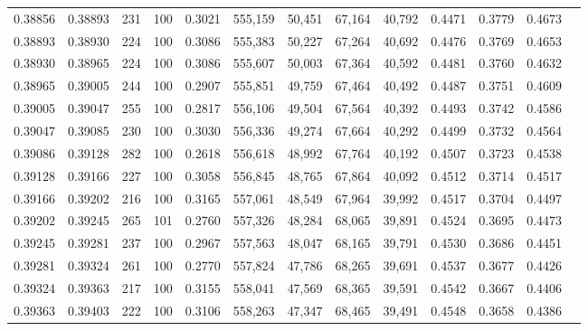 \begin{tabular}{rrrrrrrrrrrrr}
0.38856 & 0.38893 &   231 & 100 &                                     0.3021 & 555,159 &  50,451 &  67,164 &  40,792 & 0.4471 & 0.3779 & 0.4673 \\
0.38893 & 0.38930 &   224 & 100 &                                     0.3086 & 555,383 &  50,227 &  67,264 &  40,692 & 0.4476 & 0.3769 & 0.4653 \\
0.38930 & 0.38965 &   224 & 100 &                                     0.3086 & 555,607 &  50,003 &  67,364 &  40,592 & 0.4481 & 0.3760 & 0.4632 \\
0.38965 & 0.39005 &   244 & 100 &                                     0.2907 & 555,851 &  49,759 &  67,464 &  40,492 & 0.4487 & 0.3751 & 0.4609 \\
0.39005 & 0.39047 &   255 & 100 &                                     0.2817 & 556,106 &  49,504 &  67,564 &  40,392 & 0.4493 & 0.3742 & 0.4586 \\
0.39047 & 0.39085 &   230 & 100 &                                     0.3030 & 556,336 &  49,274 &  67,664 &  40,292 & 0.4499 & 0.3732 & 0.4564 \\
0.39086 & 0.39128 &   282 & 100 &                                     0.2618 & 556,618 &  48,992 &  67,764 &  40,192 & 0.4507 & 0.3723 & 0.4538 \\
0.39128 & 0.39166 &   227 & 100 &                                     0.3058 & 556,845 &  48,765 &  67,864 &  40,092 & 0.4512 & 0.3714 & 0.4517 \\
0.39166 & 0.39202 &   216 & 100 &                                     0.3165 & 557,061 &  48,549 &  67,964 &  39,992 & 0.4517 & 0.3704 & 0.4497 \\
0.39202 & 0.39245 &   265 & 101 &                                     0.2760 & 557,326 &  48,284 &  68,065 &  39,891 & 0.4524 & 0.3695 & 0.4473 \\
0.39245 & 0.39281 &   237 & 100 &                                     0.2967 & 557,563 &  48,047 &  68,165 &  39,791 & 0.4530 & 0.3686 & 0.4451 \\
0.39281 & 0.39324 &   261 & 100 &                                     0.2770 & 557,824 &  47,786 &  68,265 &  39,691 & 0.4537 & 0.3677 & 0.4426 \\
0.39324 & 0.39363 &   217 & 100 &                                     0.3155 & 558,041 &  47,569 &  68,365 &  39,591 & 0.4542 & 0.3667 & 0.4406 \\
0.39363 & 0.39403 &   222 & 100 &                                     0.3106 & 558,263 &  47,347 &  68,465 &  39,491 & 0.4548 & 0.3658 & 0.4386 \\

\end{tabular}
